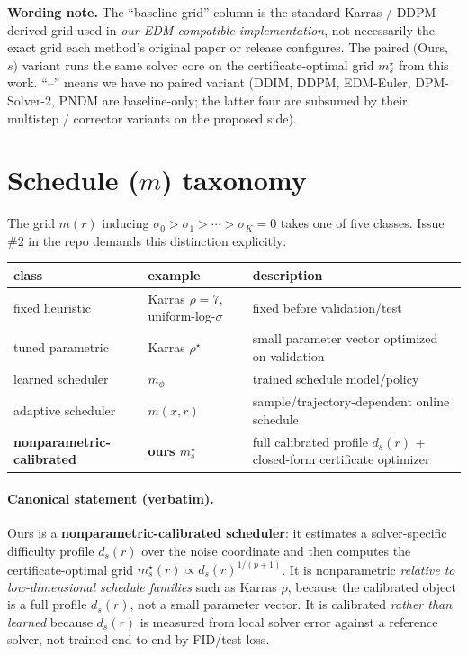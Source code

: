 \documentclass[11pt]{article}
\begin{document}
\noindent
\textbf{Wording note.} The ``baseline grid'' column is the standard
Karras / DDPM-derived grid used in \emph{our EDM-compatible
implementation}, not necessarily the exact grid each method's original
paper or release configures. The paired \((\)Ours, \(s)\) variant runs
the same solver core on the certificate-optimal grid \(m_s^\star\) from
this work. ``--'' means we have no paired variant (DDIM, DDPM, EDM-Euler,
DPM-Solver-2, PNDM are baseline-only; the latter four are subsumed by
their multistep / corrector variants on the proposed side).

\section{Schedule (\(m\)) taxonomy}

The grid \(m(r)\) inducing \(\sigma_0 > \sigma_1 > \cdots > \sigma_K = 0\)
takes one of five classes. Issue \#2 in the repo demands this distinction
explicitly:

\begin{center}
\small
\begin{tabular}{l l p{6.5cm}}
\toprule
class & example & description \\
\midrule
fixed heuristic            & Karras \(\rho{=}7\), uniform-log-\(\sigma\)   & fixed before validation/test \\
tuned parametric           & Karras \(\rho^\star\)                         & small parameter vector optimized on validation \\
learned scheduler          & \(m_\phi\)                                    & trained schedule model/policy \\
adaptive scheduler         & \(m(x,r)\)                                    & sample/trajectory-dependent online schedule \\
\textbf{nonparametric-calibrated} & \textbf{ours \(m_s^\star\)}            & full calibrated profile \(d_s(r)\) + closed-form certificate optimizer \\
\bottomrule
\end{tabular}
\end{center}

\paragraph{Canonical statement (verbatim).}
Ours is a \textbf{nonparametric-calibrated scheduler}: it estimates a
solver-specific difficulty profile \(d_s(r)\) over the noise coordinate
and then computes the certificate-optimal grid
\(m_s^\star(r) \propto d_s(r)^{1/(p+1)}\). It is nonparametric \emph{relative
to low-dimensional schedule families} such as Karras \(\rho\), because the
calibrated object is a full profile \(d_s(r)\), not a small parameter
vector. It is calibrated \emph{rather than learned} because \(d_s(r)\) is
measured from local solver error against a reference solver, not trained
end-to-end by FID/test loss.
\end{document}
